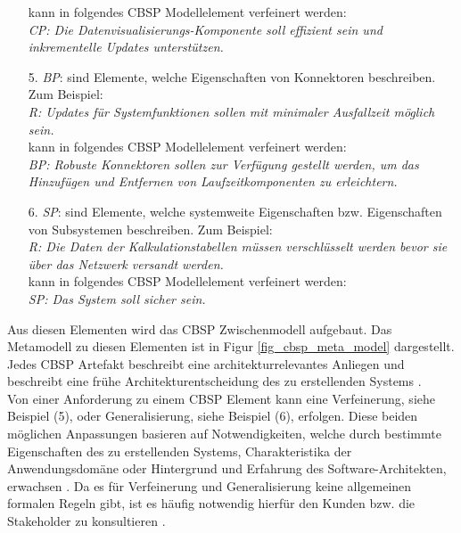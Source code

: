 \begin{itemize}
	kann in folgendes CBSP Modellelement verfeinert werden: \\
	\textit{CP: Die Datenvisualisierungs-Komponente soll effizient sein und inkrementelle Updates unterstützen.} \cite{Gru01}
\item[5.] \textit{BP}: sind Elemente, welche Eigenschaften von Konnektoren beschreiben. Zum Beispiel: \\
	\textit{R: Updates für Systemfunktionen sollen mit minimaler Ausfallzeit möglich sein.} \\
	kann in folgendes CBSP Modellelement verfeinert werden: \\
	\textit{BP: Robuste Konnektoren sollen zur Verfügung gestellt werden, um das Hinzufügen und Entfernen von Laufzeitkomponenten zu erleichtern.} \cite{Gru01}
\item[6.] \textit{SP}: sind Elemente, welche systemweite Eigenschaften bzw. Eigenschaften von Subsystemen beschreiben. Zum Beispiel: \\
	\textit{R: Die Daten der Kalkulationstabellen müssen verschlüsselt werden bevor sie über das Netzwerk versandt werden.} \\
	kann in folgendes CBSP Modellelement verfeinert werden: \\
	\textit{SP: Das System soll sicher sein.} \cite{Gru01} \\
\end{itemize}

Aus diesen Elementen wird das CBSP Zwischenmodell aufgebaut. Das Metamodell zu diesen Elementen ist in Figur \ref{fig_cbsp_meta_model} dargestellt. Jedes CBSP Artefakt beschreibt eine architekturrelevantes Anliegen und beschreibt eine frühe Architekturentscheidung des zu erstellenden Systems \cite{Gru01}. \\

Von einer Anforderung zu einem CBSP Element kann eine Verfeinerung, siehe Beispiel (5), oder Generalisierung, siehe Beispiel (6), erfolgen. Diese beiden möglichen Anpassungen basieren auf Notwendigkeiten, welche durch bestimmte Eigenschaften des zu erstellenden Systems, Charakteristika der Anwendungsdomäne oder Hintergrund und Erfahrung des Software-Architekten, erwachsen \cite{Gru01}. Da es für Verfeinerung und Generalisierung keine allgemeinen formalen Regeln gibt, ist es häufig notwendig hierfür den Kunden bzw. die Stakeholder zu konsultieren \cite{Gru01}. 

